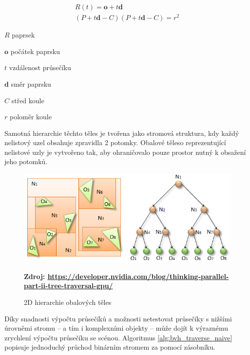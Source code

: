\begin{equation} \label{eq:sphere_ray_intersection}
	\begin{gathered}
	    R(t) = \textbf{o} + t\textbf{d}  \\
	    
	    (P + t\textbf{d} - C) (P + t\textbf{d} - C) = r^2
	    
	\end{gathered}
\end{equation}

\begin{eqexpl}[60mm]
\item{$R$} paprsek
\item{$\textbf{o}$} počátek paprsku
\item{$t$} vzdálenost průsečíku
\item{$\textbf{d}$} směr paprsku
\item{$C$} střed koule
\item{$r$} poloměr koule
\end{eqexpl}

Samotná hierarchie těchto těles je tvořena jako stromová struktura, kdy každý nelistový uzel obsahuje zpravidla 2 potomky. Obalové těleso reprezentující nelistové uzly je vytvořeno tak, aby ohraničovalo pouze prostor nutný k obsažení jeho potomků.

\begin{figure}[H]
	\centering
	\includegraphics[scale=0.5]{images/fig03-bvh.png}
	\caption{2D hierarchie obalových těles}
	\textbf{Zdroj: \url{https://developer.nvidia.com/blog/thinking-parallel-part-ii-tree-traversal-gpu/}}
	\label{fig:slabs}
\end{figure}

Díky snadnosti výpočtu průsečíků a možnosti netestovat průsečíky s nižšími úrovněmi stromu -- a tím i komplexními objekty -- může dojít k výraznému zrychlení výpočtu průsečíku se scénou. Algoritmus \ref{alg:bvh_traverse_naive} popisuje jednoduchý průchod binárním stromem za pomocí zásobníku.

